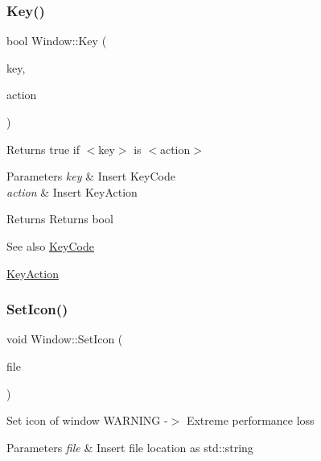 \subsubsection{\texorpdfstring{Key()}{Key()}\hspace{0.1cm}{\footnotesize\ttfamily [2/2]}}
{\footnotesize\ttfamily bool Window\+::\+Key (\begin{DoxyParamCaption}\item[{\mbox{\hyperlink{class_window_a4915898e3e02586ae359c8cfb9114717}{Key\+Code}}}]{key,  }\item[{\mbox{\hyperlink{class_window_ab44a7b55f0ce55c37d361fc51b302bdb}{Key\+Action}}}]{action }\end{DoxyParamCaption})}

Returns true if $<$key$>$ is $<$action$>$ 
\begin{DoxyParams}{Parameters}
{\em key} & Insert Key\+Code \\
\hline
{\em action} & Insert Key\+Action \\
\hline
\end{DoxyParams}
\begin{DoxyReturn}{Returns}
Returns bool 
\end{DoxyReturn}
\begin{DoxySeeAlso}{See also}
\mbox{\hyperlink{class_window_a4915898e3e02586ae359c8cfb9114717}{Key\+Code}} 

\mbox{\hyperlink{class_window_ab44a7b55f0ce55c37d361fc51b302bdb}{Key\+Action}} 
\end{DoxySeeAlso}
\mbox{\label{class_window_a4275c9bf6717a8365f1d89fbe03e2e8b}} 
\subsubsection{\texorpdfstring{SetIcon()}{SetIcon()}}
{\footnotesize\ttfamily void Window\+::\+Set\+Icon (\begin{DoxyParamCaption}\item[{std\+::string}]{file }\end{DoxyParamCaption})}

Set icon of window W\+A\+R\+N\+I\+NG -\/$>$ Extreme performance loss 
\begin{DoxyParams}{Parameters}
{\em file} & Insert file location as std\+::string \\
\hline
\end{DoxyParams}
\mbox{\label{class_window_aebff502aa62f526a058c3cda6bae6ed4}} 
